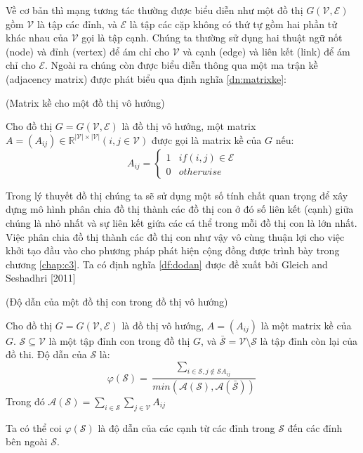 Về cơ bản thì mạng tương tác thường được biểu diễn như một đồ thị $G(\mathcal{V},\mathcal{E})$ gồm $\mathcal{V}$ là tập các đỉnh, và $\mathcal{E}$ là tập các cặp không có thứ tự gồm hai phần tử khác nhau của $\mathcal{V}$ gọi là tập cạnh. Chúng ta thường sử dụng hai thuật ngữ nốt (node) và đỉnh (vertex) để ám chỉ cho $\mathcal{V}$ và cạnh (edge) và liên kết (link) để ám chỉ cho $\mathcal{E}$. Ngoài ra chúng còn được biểu diễn thông qua một ma trận kề (adjacency matrix) được phát biểu qua định nghĩa \ref{dn:matrixke}:
\begin{definition}(Matrix kề cho một đồ thị vô hướng)\label{dn:matrixke}
	
	Cho đồ thị $G = G(\mathcal{V},\mathcal{E})$ là đồ thị vô hướng, một matrix $A = (A_{ij}) \in  \mathbb{R}^{|\mathcal{V}|\times|\mathcal{V}|} (i,j \in \mathcal{V})$ được gọi là matrix kề của $G$ nếu:
	\begin{equation}
		A_{ij} = \left\{
		\begin{array}{cc}
		1 & if (i,j) \in \mathcal{E}\\
		0 & otherwise
		\end{array}
		\right.
	\end{equation}
\end{definition}

Trong lý thuyết đồ thị chúng ta sẽ sử dụng một số tính chất quan trọng để xây dựng mô hình phân chia đồ thị thành các đồ thị con ở đó số liên kết (cạnh) giữa chúng là nhỏ nhất và sự liên kết giứa các cá thể trong mỗi đồ thị con là lớn nhất. Việc phân chia đồ thị thành các đồ thị con như vậy vô cùng thuận lợi cho việc khởi tạo đầu vào cho phương pháp phát hiện cộng đồng được trình bày trong chương \ref{chap:c3}. Ta có định nghĩa \ref{df:dodan} được đề xuất bởi Gleich and
Seshadhri [2011] \cite{DBLP:journals/corr/abs-1112-0031}

\begin{definition}(Độ dẫn của một đồ thị con trong đồ thị vô hướng)\label{df:dodan}
	
	Cho đồ thị $G = G(\mathcal{V},\mathcal{E})$ là đồ thị vô hướng, $A = (A_{ij})$ là một matrix kề của $G$. $\mathcal{S} \subseteq \mathcal{V}$ là một tập đỉnh con trong đồ thị $G$, và $\bar{\mathcal{S}} = \mathcal{V} \setminus \mathcal{S}$ là tập đỉnh còn lại của đồ thi. Độ dẫn của $\mathcal{S}$ là:
	\begin{equation}
		\varphi(\mathcal{S}) = \dfrac{\sum_{i \in \mathcal{S},j \notin \mathcal{S}{A_{ij}}}}{min(\mathcal{A}(\mathcal{S}),\mathcal{A}(\bar{\mathcal{S}}))}
	\end{equation}
	Trong đó $\mathcal{A}(\mathcal{S}) = \sum_{i \in \mathcal{S}}\sum_{j \in \mathcal{V}}A_{ij}$
\end{definition}
Ta có thể coi $\varphi(\mathcal{S})$ là độ dẫn của các cạnh từ các đỉnh trong $\mathcal{S}$ đến các đỉnh bên ngoài $\mathcal{S}$.


